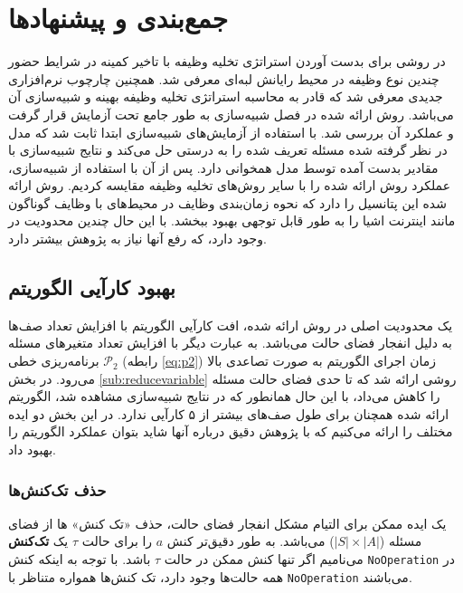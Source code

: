 \chapter{جمع‌بندی و پیشنهاد‌ها}
در \CurrentProject روشی برای بدست آوردن استراتژی تخلیه وظیفه با تاخیر کمینه در شرایط حضور چندین نوع وظیفه در محیط رایانش لبه‌ای معرفی شد. همچنین چارچوب نرم‌افزاری جدیدی معرفی شد که قادر به محاسبه استراتژی تخلیه وظیفه بهینه و شبیه‌سازی آن می‌باشد. روش ارائه شده در فصل شبیه‌سازی به طور جامع تحت آزمایش قرار گرفت و عملکرد آن بررسی شد. با استفاده از آزمایش‌های شبیه‌سازی ابتدا ثابت شد که مدل در نظر گرفته شده مسئله تعریف شده را به درستی حل می‌کند و نتایج شبیه‌سازی با مقادیر بدست آمده توسط مدل همخوانی دارد. پس از آن با استفاده از شبیه‌سازی، عملکرد روش ارائه شده را با سایر روش‌های تخلیه وظیفه مقایسه کردیم. روش ارائه شده این پتانسیل را دارد که نحوه زمان‌بندی وظایف در محیط‌های با وظایف گوناگون مانند اینترنت اشیا را به طور قابل توجهی بهبود ببخشد. با این حال چندین محدودیت در \CurrentProject وجود دارد، که رفع آنها نیاز به پژوهش بیشتر دارد. 

\section{بهبود کارآیی الگوریتم}
یک محدودیت اصلی در روش ارائه شده، افت کارآیی الگوریتم با افزایش تعداد صف‌ها به دلیل انفجار فضای حالت می‌باشد. به عبارت دیگر با افزایش تعداد متغیرهای مسئله برنامه‌ریزی خطی
$\mathcal{P}_2$
(رابطه \ref{eq:p2}) زمان اجرای الگوریتم به صورت تصاعدی بالا می‌رود. در بخش \ref{sub:reducevariable} روشی ارائه شد که تا حدی فضای حالت مسئله را کاهش می‌داد، با این حال همانطور که در نتایج شبیه‌سازی مشاهده شد، الگوریتم ارائه شده همچنان برای طول صف‌های بیشتر از ۵ کارآیی ندارد. در این بخش دو ایده مختلف را ارائه می‌کنیم که با پژوهش دقیق درباره آنها شاید بتوان عملکرد الگوریتم را بهبود داد.
\subsection{حذف تک‌کنش‌ها}
یک ایده ممکن برای التیام مشکل انفجار فضای حالت، حذف «تک کنش» ها از فضای مسئله ($|S| \times |A|$) می‌باشد. به طور دقیق‌تر کنش $a$ را برای حالت $\tau$ یک \textbf{تک‌کنش} می‌نامیم اگر تنها کنش ممکن در حالت $\tau$ باشد. با توجه به اینکه کنش \texttt{\footnotesize NoOperation} در همه حالت‌ها وجود دارد، تک کنش‌ها همواره متناظر با \texttt{\footnotesize NoOperation} می‌باشند. \\


